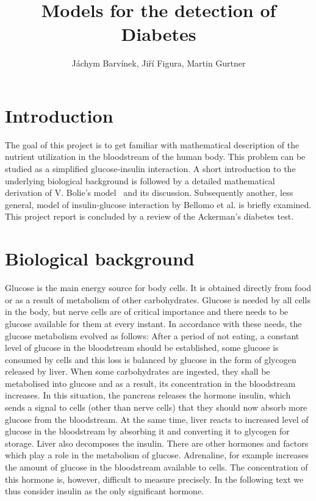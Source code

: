 \documentclass{article}
\begin{document}
\title{Models for the detection of Diabetes}
\author{J\'achym Barv\'inek, Ji\v r\'i Figura, Martin Gurtner}

\maketitle

\section{Introduction}

The goal of this project is to get familiar with mathematical description of the nutrient utilization in the bloodstream of the human body. This problem can be studied as a simplified glucose-insulin interaction.
A short introduction to the underlying biological background is followed by a detailed mathematical derivation of V. Bolie's model~\cite{bolie1961coefficients} and its discussion.
Subsequently another, less general, model of insulin-glucose interaction by Bellomo et al. is briefly examined.
This project report is concluded by a review of the Ackerman's diabetes test. 

\section{Biological background}

Glucose is the main energy source for body cells. It is obtained directly from food or as a result of metabolism of other carbohydrates. Glucose is needed by all cells in the body, but nerve cells are of critical importance and there needs
to be glucose available for them at every instant. In accordance with these needs, the glucose
metabolism evolved as follows:
After a period of not eating, a constant level of glucose in the bloodstream should be established,
some glucose is consumed by cells and this loss is balanced by glucose in the form of glycogen
released by liver. When some carbohydrates are ingested, they shall be metabolised into glucose
and as a result, its concentration in the bloodstream increases. In this situation, the pancreas
releases the hormone insulin, which sends a signal to cells (other than nerve cells) that they should
now absorb more glucose from the bloodstream. At the same time, liver reacts to increased level of 
glucose in the bloodstream by absorbing it and converting it to glycogen for storage. Liver also 
decomposes the insulin. There are other hormones and factors which play a role in the metabolism
of glucose. Adrenaline, for example increases the amount of glucose in the bloodstream available
to cells. The concentration of this hormone is, however, difficult to measure precisely.
In the following text we thus consider insulin as the only significant hormone.
\end{document}
